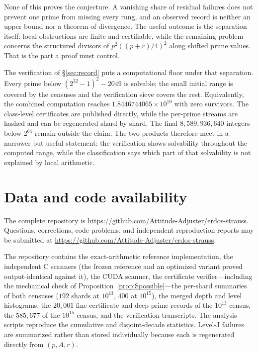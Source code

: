 \documentclass[11pt]{article}
\theoremstyle{definition}
\theoremstyle{remark}
\begin{document}
None of this proves the conjecture. A vanishing share of residual failures does not
prevent one prime from missing every rung, and an observed record is neither an upper
bound nor a theorem of divergence. The useful outcome is the separation itself: local
obstructions are finite and certifiable, while the remaining problem concerns the
structured divisors of $p^2((p+r)/4)^2$ along shifted prime values. That is the part a
proof must control.

The verification of \S\ref{sec:record} puts a computational floor under that
separation. Every prime below $(2^{32}-1)^2-2049$ is solvable; the small initial range
is covered by the censuses and the verification sieve covers the rest. Equivalently,
the combined computation reaches $1.8446744065\times10^{19}$ with zero survivors. The
class-level certificates are published directly, while the per-prime streams are
hashed and can be regenerated shard by shard. The final $8{,}589{,}936{,}640$ integers
below $2^{64}$ remain outside the claim. The two products therefore meet in a narrower
but useful statement: the verification shows solvability throughout the computed
range, while the classification says which part of that solvability is not explained
by local arithmetic.

\section*{Data and code availability}\label{sec:data-availability}

The complete repository is
\url{https://github.com/Attitude-Adjuster/erdos-strauss}. Questions, corrections, code
problems, and independent reproduction reports may be submitted at
\url{https://github.com/Attitude-Adjuster/erdos-strauss}.

The repository contains the exact-arithmetic reference implementation, the
independent C\raisebox{0.2ex}{\small ++} scanners (the frozen reference and an
optimized variant proved output-identical against it), the CUDA scanner, the
certificate verifier---including the mechanical check of
Proposition~\ref{prop:Spossible}---the per-shard summaries of both censuses ($192$
shards at $10^{13}$, $400$ at $10^{15}$), the merged depth and level histograms, the
$20{,}001$ fine-certificate and deep-prime records of the $10^{13}$ census, the
$585{,}677$ of the $10^{15}$ census, and the verification transcripts. The analysis
scripts reproduce the cumulative and disjoint-decade statistics. Level-J failures are
summarized rather than stored individually because each is regenerated directly from
$(p,A,r)$.
\end{document}
